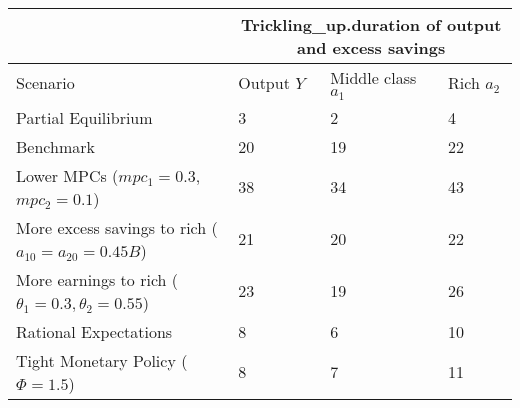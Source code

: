 \documentclass[11pt]{article}
\begin{document}
\begin{tabular}{llll}
\hline
& \multicolumn{3}{c}{Trickling_up.duration of output and excess savings} \\
\hline
Scenario & Output $Y$ & Middle class $a_1$ & Rich $a_2$ \\
\hline\hline
Partial Equilibrium & 3 & 2 & 4 \\

Benchmark & 20 & 19 & 22 \\

Lower MPCs ($mpc_1=0.3$,
$mpc_2=0.1$)
& 38 & 34 & 43 \\

More excess savings to rich ($a_{10}=a_{20}=0.45B$)
& 21 & 20 & 22 \\

More earnings to rich ($\theta_1=0.3,\theta_2=0.55$)
& 23 & 19 & 26 \\

Rational Expectations & 8 & 6 & 10 \\

Tight Monetary Policy ($\Phi = 1.5$)
& 8 & 7 & 11 \\
\hline
\end{tabular}
\end{document}
